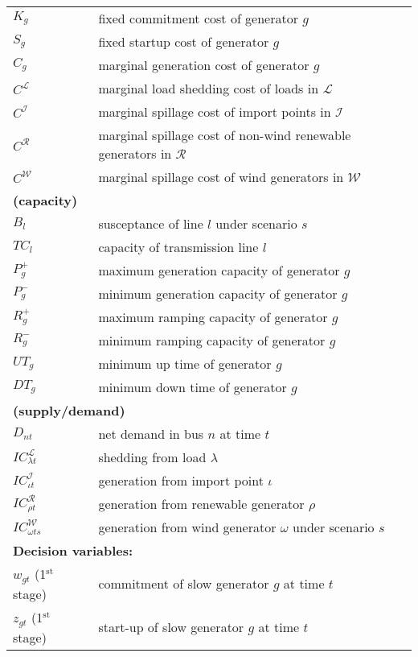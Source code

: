\begin{table}[]
\begin{tabular}{ll}
		$K_g$ & fixed commitment cost of generator $g$ \\
		$S_g$ & fixed startup cost of generator $g$\\
		$C_g$ & marginal generation cost of generator $g$	\\
		$C^\mathcal{L}$ & marginal load shedding cost of loads in $\mathcal{L}$	\\
		$C^\mathcal{I}$ & marginal spillage cost of import points in $\mathcal{I}$ \\
		$C^\mathcal{R}$ & marginal spillage cost of non-wind  renewable generators in $\mathcal{R}$ \\ 
		$C^\mathcal{W}$ & marginal spillage cost of wind generators in $\mathcal{W}$ \\
		\multicolumn{2}{l}{\textbf{(capacity)}} \\
		$B_{l}$ & susceptance of line $l$ under scenario $s$\\
		$TC_l$ & capacity of transmission line $l$\\
		$P_{g}^+$ & maximum generation capacity of generator $g$\\
		$P_{g}^-$ & minimum generation capacity of generator $g$ \\
		$R_{g}^+$ & maximum ramping capacity of generator $g$\\
		$R_{g}^-$ & minimum ramping capacity of generator $g$\\
		$UT_{g}$ & minimum up time of generator $g$\\
		$DT_{g}$ & minimum down time of generator $g$\\
		\multicolumn{2}{l}{\textbf{(supply/demand)}} \\
		$D_{nt}$ & net demand in bus $n$ at time $t$ \\
		$IC_{\lambda t}^\mathcal{L}$ & shedding from load $\lambda$\\
		$IC_{\iota t}^\mathcal{I}$ & generation from import point $\iota$\\
		$IC_{\rho t}^\mathcal{R}$ & generation from renewable generator $\rho$\\
		$IC_{\omega ts}^\mathcal{W}$ & generation from wind generator $\omega$ under scenario $s$\\ \midrule
		\multicolumn{2}{l}{\textbf{Decision variables:}} \\
		$w_{gt}$ (1$^{\textrm{st}}$ stage) 	& commitment of slow generator $g$ at time $t$\\
		$z_{gt}$ (1$^{\textrm{st}}$ stage)	&	start-up of slow generator $g$ at time $t$\\

\end{tabular}
\end{table}
